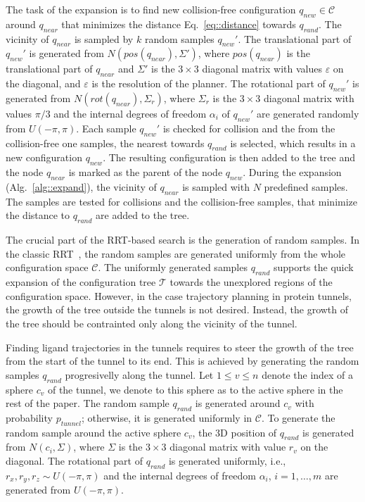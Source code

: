 \documentclass{bmcart}
\def\qrand{q_{rand}}
\def\qnear{q_{near}}
\def\qnew{q_{new}}
\def\T{\mathcal{T}}
\def\C{\mathcal{C}}
\def\gb{p_{tunnel}}
\begin{document}
The task of the expansion is to find new collision-free configuration $\qnew \in \C$ around $\qnear$ that minimizes the distance
Eq.~\eqref{eq::distance} towards $\qrand$.
The vicinity of $\qnear$ is sampled by $k$ random samples $\qnew'$. 
The translational part of $\qnew'$ is generated from $N(pos(\qnear),\Sigma')$, 
where $pos(\qnear)$ is the translational part of $\qnear$ and $\Sigma'$ is
the $3 \times 3$ diagonal matrix with values $\varepsilon$ on the diagonal, and $\varepsilon$ is the resolution of the planner.
The rotational part of $\qnew'$ is generated from $N(rot(\qnear), \Sigma_r)$, where $\Sigma_r$ is the $3 \times 3$ diagonal
matrix with values $\pi/3$ and the internal degrees of freedom $\alpha_i$ of $\qnew'$ are generated
randomly from $U(-\pi,\pi)$.
Each sample $\qnew'$ is checked for collision and the from the collision-free one samples, the nearest towards $\qrand$ is 
selected, which results in a new configuration $\qnew$.
The resulting configuration is then added to the tree and the node $\qnear$ is marked as the parent of the node $\qnew$.
During the expansion (Alg.~\ref{alg::expand}), the vicinity of $\qnear$ is sampled with $N$ predefined samples.
The samples are tested for collisions and the collision-free samples, that minimize the distance to $\qrand$ are added to the tree.

The crucial part of the RRT-based search is the generation of random samples.
In the classic RRT~\cite{lavalleRRT}, the random samples are generated uniformly from the whole configuration space $\C$.
The uniformly generated samples $\qrand$ supports the quick expansion of the configuration tree $\T$ towards the unexplored
regions of the configuration space.
However, in the case trajectory planning in protein tunnels, the growth of the tree outside the tunnels is not desired.
Instead, the growth of the tree should be contrainted only along the vicinity of the tunnel.

Finding ligand trajectories in the tunnels requires to steer the growth of the tree from the start of the tunnel to its end.
This is achieved by generating the random samples $\qrand$ progresivelly along the tunnel.
Let $1 \le v \le n$ denote the index of a sphere $c_v$ of the tunnel, we denote to this sphere as to the active sphere in the rest of the paper.
The random sample $\qrand$ is generated around  $c_v$ with probability $\gb$; otherwise, it is generated uniformly in $\C$.
To generate the random sample around the active sphere $c_v$, the 3D position of $\qrand$ is generated from $N(c_i,\Sigma)$, where
$\Sigma$ is the $3\times 3$ diagonal matrix with value $r_v$ on the diagonal.
The rotational part of $\qrand$ is generated uniformly, i.e., $r_x,r_y,r_z \sim U(-\pi,\pi)$ and the internal degrees of 
freedom $\alpha_i$, $i=1,\ldots,m$ are generated from $U(-\pi,\pi)$.
\end{document}
